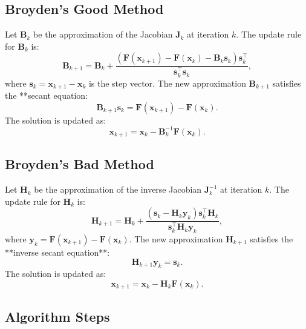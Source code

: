 \documentclass[%
oneside,                 %
final,                   %
10pt]{article}
\begin{document}
\noindent
\subsection{Broyden’s Good Method}

Let \( \mathbf{B}_k \) be the approximation of the Jacobian \( \mathbf{J}_k \) at iteration \( k \). The update rule for \( \mathbf{B}_k \) is:
\[
\mathbf{B}_{k+1} = \mathbf{B}_k + \frac{(\mathbf{F}(\mathbf{x}_{k+1}) - \mathbf{F}(\mathbf{x}_k) - \mathbf{B}_k \mathbf{s}_k) \mathbf{s}_k^\top}{\mathbf{s}_k^\top \mathbf{s}_k},
\]
where \( \mathbf{s}_k = \mathbf{x}_{k+1} - \mathbf{x}_k \) is the step vector. The new approximation \( \mathbf{B}_{k+1} \) satisfies the **secant equation:
\[
\mathbf{B}_{k+1} \mathbf{s}_k = \mathbf{F}(\mathbf{x}_{k+1}) - \mathbf{F}(\mathbf{x}_k).
\]
The solution is updated as:
\[
\mathbf{x}_{k+1} = \mathbf{x}_k - \mathbf{B}_k^{-1} \mathbf{F}(\mathbf{x}_k).
\]

\subsection{Broyden’s Bad Method}

Let \( \mathbf{H}_k \) be the approximation of the inverse Jacobian \( \mathbf{J}_k^{-1} \) at iteration \( k \). The update rule for \( \mathbf{H}_k \) is:
\[
\mathbf{H}_{k+1} = \mathbf{H}_k + \frac{(\mathbf{s}_k - \mathbf{H}_k \mathbf{y}_k) \mathbf{s}_k^\top \mathbf{H}_k}{\mathbf{s}_k^\top \mathbf{H}_k \mathbf{y}_k},
\]
where \( \mathbf{y}_k = \mathbf{F}(\mathbf{x}_{k+1}) - \mathbf{F}(\mathbf{x}_k) \). The new approximation \( \mathbf{H}_{k+1} \) satisfies the **inverse secant equation**:
\[
\mathbf{H}_{k+1} \mathbf{y}_k = \mathbf{s}_k.
\]
The solution is updated as:
\[
\mathbf{x}_{k+1} = \mathbf{x}_k - \mathbf{H}_k \mathbf{F}(\mathbf{x}_k).
\]

\subsection{Algorithm Steps}
\end{document}
